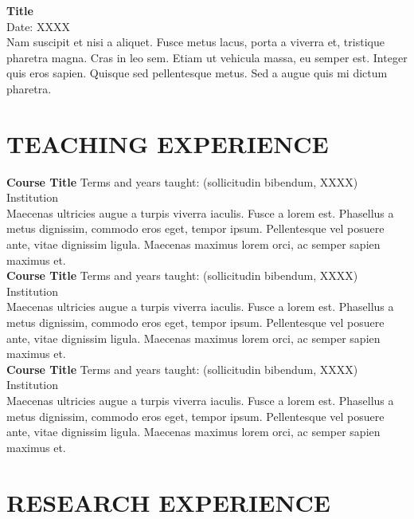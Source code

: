 \documentclass{article}
\begin{document}
\noindent
\textbf{Title} \\
Date: XXXX \\
Nam suscipit et nisi a aliquet. Fusce metus lacus, porta a viverra et, tristique pharetra magna. Cras in leo sem. Etiam ut vehicula massa, eu semper est. Integer quis eros sapien. Quisque sed pellentesque metus. Sed a augue quis mi dictum pharetra. 


\section*{TEACHING EXPERIENCE}

\noindent
\newline
\textbf{Course Title} \hfill Terms and years taught: (sollicitudin bibendum, XXXX)\\
Institution\\
Maecenas ultricies augue a turpis viverra iaculis. Fusce a lorem est. Phasellus a metus dignissim, commodo eros eget, tempor ipsum. Pellentesque vel posuere ante, vitae dignissim ligula. Maecenas maximus lorem orci, ac semper sapien maximus et. \\ 

\noindent
\textbf{Course Title} \hfill Terms and years taught: (sollicitudin bibendum, XXXX)\\
Institution\\
Maecenas ultricies augue a turpis viverra iaculis. Fusce a lorem est. Phasellus a metus dignissim, commodo eros eget, tempor ipsum. Pellentesque vel posuere ante, vitae dignissim ligula. Maecenas maximus lorem orci, ac semper sapien maximus et. \\

\noindent
\textbf{Course Title} \hfill Terms and years taught: (sollicitudin bibendum, XXXX)\\
Institution\\
Maecenas ultricies augue a turpis viverra iaculis. Fusce a lorem est. Phasellus a metus dignissim, commodo eros eget, tempor ipsum. Pellentesque vel posuere ante, vitae dignissim ligula. Maecenas maximus lorem orci, ac semper sapien maximus et. 


\section*{RESEARCH EXPERIENCE}
\end{document}
